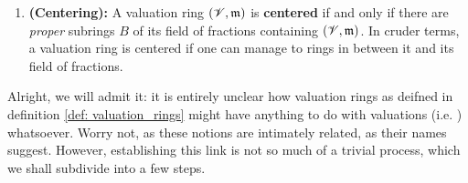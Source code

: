 \begin{definition}
\begin{enumerate}
                        \item \textbf{(Centering):} A valuation ring $(\mathscr{V}, \mathfrak{m})$ is \textbf{centered} if and only if there are \textit{proper} subrings $B$ of its field of fractions containing $(\mathscr{V}, \mathfrak{m})$. In cruder terms, a valuation ring is centered if one can manage to  rings in between it and its field of fractions.
                    \end{enumerate}
                \end{definition}
                
                Alright, we will admit it: it is entirely unclear how valuation rings as deifned in definition \ref{def: valuation_rings} might have anything to do with valuations (i.e. ) whatsoever. Worry not, as these notions are intimately related, as their names suggest. However, establishing this link is not so much of a trivial process, which we shall subdivide into a few steps.
                
